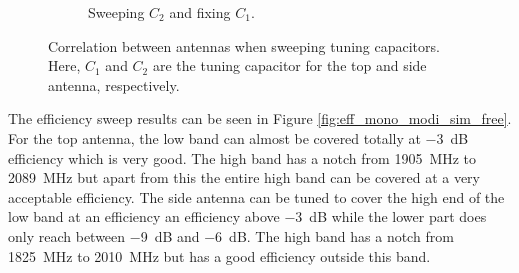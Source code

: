 \begin{figure}[htbp]
\begin{subfigure}{0.49\linewidth}
        \caption{Sweeping $C_2$ and fixing $C_1$.}
    \end{subfigure}
    \caption{Correlation between antennas when sweeping tuning capacitors. Here, $C_1$ and $C_2$ are the tuning capacitor for the top and side antenna, respectively.}
    \label{fig:corr_mono_modi_sim_free}
\end{figure}

The efficiency sweep results can be seen in Figure \ref{fig:eff_mono_modi_sim_free}. For the top antenna, the low band can almost be covered totally at \SI{-3}{dB} efficiency which is very good. The high band has a notch from \SI{1905}{MHz} to \SI{2089}{MHz} but apart from this the entire high band can be covered at a very acceptable efficiency. The side antenna can be tuned to cover the high end of the low band at an efficiency an efficiency above \SI{-3}{dB} while the lower part does only reach between \SI{-9}{dB} and \SI{-6}{dB}. The high band has a notch from \SI{1825}{MHz} to \SI{2010}{MHz} but has a good efficiency outside this band.

